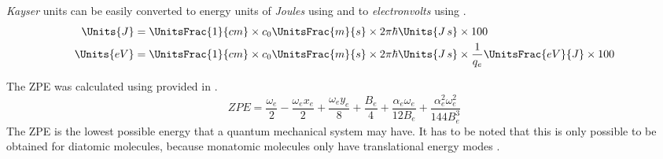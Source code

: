     \begin{table}[H]
        \centering
            \caption{Spectroscopy constants for ground level
            \cite{USDC2023}\label{tab:spectroscopyConstant2}}
    \end{table}
    \textit{Kayser} units can be easily converted to energy
    units of \textit{Joules} using  and to
    \textit{electronvolts} using .
    \begin{subequations}\label{eq:wavenumberToEnergy}
        \begin{align}
            \Units{J} &= \UnitsFrac{1}{cm} \times c_0 \UnitsFrac{m}{s} \times
            2\pi\hbar\Units{J\,s} \times 100 \label{eq:wavenumberToJoules} \\
            \Units{eV} &= \UnitsFrac{1}{cm} \times c_0 \UnitsFrac{m}{s} \times
            2\pi\hbar\Units{J\,s} \times \frac{1}{q_e}
            \UnitsFrac{eV}{J} \times 100
            \label{eq:wavenumberToElectronvolts}
        \end{align}
    \end{subequations}

    The \gls{ZPE} was calculated using  provided in
    \cite{Irikura2007}. 
    \begin{equation}\label{eq:zpe}
        ZPE = \frac{\omega_e}{2} - \frac{\omega_ex_e}{2} + \frac{\omega_ey_e}{8} +
        \frac{B_e}{4} + \frac{\alpha_e\omega_e}{12B_e} +
        \frac{\alpha_e^2\omega_e^2}{144B_e^3}
    \end{equation}
    The \gls{ZPE} is the lowest possible energy that a
    quantum mechanical system may have. It has to be noted that this is only
    possible to be obtained for diatomic molecules, because monatomic
    molecules only have translational energy modes \cite{Eisberg1985}. \\

